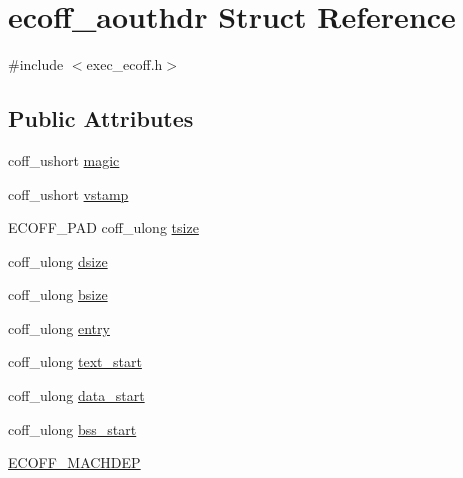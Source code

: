 \hypertarget{structecoff__aouthdr}{
\section{ecoff\_\-aouthdr Struct Reference}
\label{structecoff__aouthdr}
}


{\ttfamily \#include $<$exec\_\-ecoff.h$>$}

\subsection*{Public Attributes}
\begin{DoxyCompactItemize}
\item 
coff\_\-ushort \hyperlink{structecoff__aouthdr_a82d81eb0a575a4bfe6704dd6a39b0512}{magic}
\item 
coff\_\-ushort \hyperlink{structecoff__aouthdr_aef7b0a58b36a3252ef5bb2b840caee06}{vstamp}
\item 
ECOFF\_\-PAD coff\_\-ulong \hyperlink{structecoff__aouthdr_a5d11e2f0b3845e3ff8b28ecafd7fab68}{tsize}
\item 
coff\_\-ulong \hyperlink{structecoff__aouthdr_aaa26380f6148639bdf0751e5a34552bf}{dsize}
\item 
coff\_\-ulong \hyperlink{structecoff__aouthdr_a86c4e5b823aad80026f9b55abbb31699}{bsize}
\item 
coff\_\-ulong \hyperlink{structecoff__aouthdr_a82254009031278d45421007ae6995d4b}{entry}
\item 
coff\_\-ulong \hyperlink{structecoff__aouthdr_ab4f38b841b2fc8477d5622ba6210b029}{text\_\-start}
\item 
coff\_\-ulong \hyperlink{structecoff__aouthdr_a4e0ff56be26d8331dfa3501e6ef275f8}{data\_\-start}
\item 
coff\_\-ulong \hyperlink{structecoff__aouthdr_a42a842c6d169c84642417ad462e1780e}{bss\_\-start}
\item 
\hyperlink{structecoff__aouthdr_a0e6e28dad22a7a2117e0e326808e5e1c}{ECOFF\_\-MACHDEP}
\end{DoxyCompactItemize}


